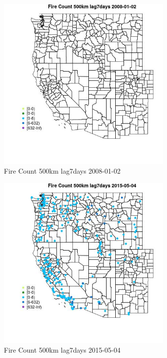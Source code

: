 \begin{figure} 
\centering  
\includegraphics[width=0.77\textwidth]{Code_Outputs/Report_ML_input_PM25_Step4_part_e_de_duplicated_aves_compiled_2019-05-18wNAs_MapObsFire_Count_500km_lag7days2008-01-02.jpg} 
\caption{\label{fig:Report_ML_input_PM25_Step4_part_e_de_duplicated_aves_compiled_2019-05-18wNAsMapObsFire_Count_500km_lag7days2008-01-02}Fire Count 500km lag7days 2008-01-02} 
\end{figure} 
 

\begin{figure} 
\centering  
\includegraphics[width=0.77\textwidth]{Code_Outputs/Report_ML_input_PM25_Step4_part_e_de_duplicated_aves_compiled_2019-05-18wNAs_MapObsFire_Count_500km_lag7days2015-05-04.jpg} 
\caption{\label{fig:Report_ML_input_PM25_Step4_part_e_de_duplicated_aves_compiled_2019-05-18wNAsMapObsFire_Count_500km_lag7days2015-05-04}Fire Count 500km lag7days 2015-05-04} 
\end{figure} 
 


